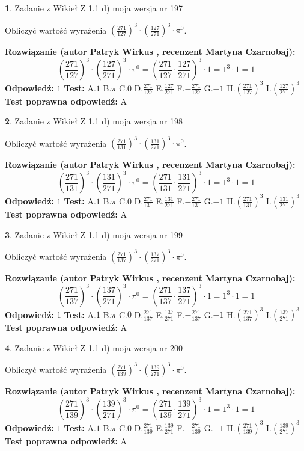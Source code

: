 \documentclass[12pt, a4paper]{article}
\theoremstyle{definition} %
\newtheorem{zad}{}
\newcommand{\zadStart}[1]{\begin{zad}#1\newline}
\newcommand{\zadStop}{\end{zad}}
\newcommand{\rozwStart}[2]{\noindent \textbf{Rozwiązanie (autor #1 , recenzent #2): }\newline}
\newcommand{\rozwStop}{\newline}
\newcommand{\odpStart}{\noindent \textbf{Odpowiedź:}\newline}
\newcommand{\odpStop}{\newline}
\newcommand{\testStart}{\noindent \textbf{Test:}\newline}
\newcommand{\testStop}{\newline}
\newcommand{\kluczStart}{\noindent \textbf{Test poprawna odpowiedź:}\newline}
\newcommand{\kluczStop}{\newline}
\begin{document}
\zadStart{Zadanie z Wikieł Z 1.1 d) moja wersja nr 197}

Obliczyć wartość wyrażenia $(\frac{271}{127})^{3} \cdot (\frac{127}{271})^{3} \cdot \pi^{0}$.
\zadStop
\rozwStart{Patryk Wirkus}{Martyna Czarnobaj}
$$(\frac{271}{127})^{3} \cdot (\frac{127}{271})^{3} \cdot \pi^{0} = (\frac{271}{127} \cdot \frac{127}{271})^{3} \cdot 1 = 1^{3} \cdot 1 = 1$$
\rozwStop
\odpStart
$1$
\odpStop
\testStart
A.$1$ B.$\pi$ C.$0$ D.$\frac{271}{127}$ E.$\frac{127}{271}$
F.$-\frac{271}{127}$ G.$-1$
H.$(\frac{271}{127})^{3}$
I.$(\frac{127}{271})^{3}$
\testStop
\kluczStart
A
\kluczStop



\zadStart{Zadanie z Wikieł Z 1.1 d) moja wersja nr 198}

Obliczyć wartość wyrażenia $(\frac{271}{131})^{3} \cdot (\frac{131}{271})^{3} \cdot \pi^{0}$.
\zadStop
\rozwStart{Patryk Wirkus}{Martyna Czarnobaj}
$$(\frac{271}{131})^{3} \cdot (\frac{131}{271})^{3} \cdot \pi^{0} = (\frac{271}{131} \cdot \frac{131}{271})^{3} \cdot 1 = 1^{3} \cdot 1 = 1$$
\rozwStop
\odpStart
$1$
\odpStop
\testStart
A.$1$ B.$\pi$ C.$0$ D.$\frac{271}{131}$ E.$\frac{131}{271}$
F.$-\frac{271}{131}$ G.$-1$
H.$(\frac{271}{131})^{3}$
I.$(\frac{131}{271})^{3}$
\testStop
\kluczStart
A
\kluczStop



\zadStart{Zadanie z Wikieł Z 1.1 d) moja wersja nr 199}

Obliczyć wartość wyrażenia $(\frac{271}{137})^{3} \cdot (\frac{137}{271})^{3} \cdot \pi^{0}$.
\zadStop
\rozwStart{Patryk Wirkus}{Martyna Czarnobaj}
$$(\frac{271}{137})^{3} \cdot (\frac{137}{271})^{3} \cdot \pi^{0} = (\frac{271}{137} \cdot \frac{137}{271})^{3} \cdot 1 = 1^{3} \cdot 1 = 1$$
\rozwStop
\odpStart
$1$
\odpStop
\testStart
A.$1$ B.$\pi$ C.$0$ D.$\frac{271}{137}$ E.$\frac{137}{271}$
F.$-\frac{271}{137}$ G.$-1$
H.$(\frac{271}{137})^{3}$
I.$(\frac{137}{271})^{3}$
\testStop
\kluczStart
A
\kluczStop



\zadStart{Zadanie z Wikieł Z 1.1 d) moja wersja nr 200}

Obliczyć wartość wyrażenia $(\frac{271}{139})^{3} \cdot (\frac{139}{271})^{3} \cdot \pi^{0}$.
\zadStop
\rozwStart{Patryk Wirkus}{Martyna Czarnobaj}
$$(\frac{271}{139})^{3} \cdot (\frac{139}{271})^{3} \cdot \pi^{0} = (\frac{271}{139} \cdot \frac{139}{271})^{3} \cdot 1 = 1^{3} \cdot 1 = 1$$
\rozwStop
\odpStart
$1$
\odpStop
\testStart
A.$1$ B.$\pi$ C.$0$ D.$\frac{271}{139}$ E.$\frac{139}{271}$
F.$-\frac{271}{139}$ G.$-1$
H.$(\frac{271}{139})^{3}$
I.$(\frac{139}{271})^{3}$
\testStop
\kluczStart
A
\kluczStop
\end{document}
